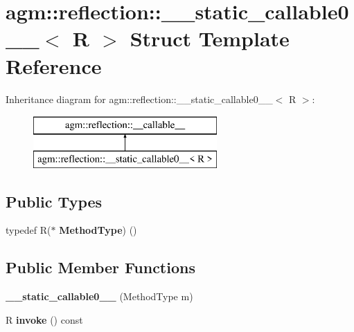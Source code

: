 \hypertarget{structagm_1_1reflection_1_1____static__callable0____}{}\section{agm\+:\+:reflection\+:\+:\+\_\+\+\_\+static\+\_\+callable0\+\_\+\+\_\+$<$ R $>$ Struct Template Reference}
\label{structagm_1_1reflection_1_1____static__callable0____}
Inheritance diagram for agm\+:\+:reflection\+:\+:\+\_\+\+\_\+static\+\_\+callable0\+\_\+\+\_\+$<$ R $>$\+:\begin{figure}[H]
\begin{center}
\leavevmode
\includegraphics[height=2.000000cm]{structagm_1_1reflection_1_1____static__callable0____}
\end{center}
\end{figure}
\subsection*{Public Types}
\begin{DoxyCompactItemize}
\item 
typedef R($\ast$ {\bfseries Method\+Type}) ()\hypertarget{structagm_1_1reflection_1_1____static__callable0_____ae7099caab34c60ef9dbd2b96172abef4}{}\label{structagm_1_1reflection_1_1____static__callable0_____ae7099caab34c60ef9dbd2b96172abef4}

\end{DoxyCompactItemize}
\subsection*{Public Member Functions}
\begin{DoxyCompactItemize}
\item 
{\bfseries \+\_\+\+\_\+static\+\_\+callable0\+\_\+\+\_\+} (Method\+Type m)\hypertarget{structagm_1_1reflection_1_1____static__callable0_____add8f3a442a27bce812f4db682ac395c7}{}\label{structagm_1_1reflection_1_1____static__callable0_____add8f3a442a27bce812f4db682ac395c7}

\item 
R {\bfseries invoke} () const \hypertarget{structagm_1_1reflection_1_1____static__callable0_____a49e144ac05328387ac4e79984e0bf20e}{}\label{structagm_1_1reflection_1_1____static__callable0_____a49e144ac05328387ac4e79984e0bf20e}

\end{DoxyCompactItemize}
